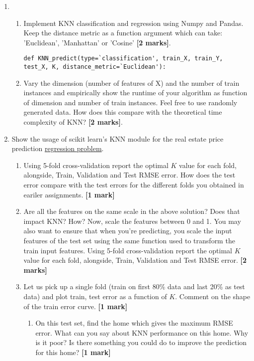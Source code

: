 \documentclass[colorlinks,linkcolor=true]{article}
\begin{document}
\begin{enumerate}


\item \begin{enumerate}
	
\item 	Implement KNN classification and regression using Numpy and Pandas. Keep the distance metric as a function argument which can take: 'Euclidean', 'Manhattan' or 'Cosine' \textbf{[2 marks]}.
\begin{verbatim}
def KNN_predict(type=`classification', train_X, train_Y, test_X, K, distance_metric=`Euclidean'):

\end{verbatim} 


	\item Vary the dimension (number of features of X) and the number of train instances and empirically show the runtime of your algorithm as function of dimension and number of train instances. Feel free to use randomly generated data. How does this compare with the theoretical time complexity of KNN?  \textbf{[2 marks]}.
\end{enumerate}

\item Show the usage of scikit learn's KNN module for the real estate price prediction \href{https://archive.ics.uci.edu/ml/datasets/Real+estate+valuation+data+set}{regression problem}.  

\begin{enumerate}
	\item Using 5-fold cross-validation report the optimal $K$ value for each fold, alongside, Train, Validation and Test RMSE error. How does the test error compare with the test errors for the different folds you obtained in eariler assignments. \textbf{[1 mark]}
	\item Are all the features on the same scale in the above solution? Does that impact KNN? How?
	Now, scale the features between 0 and 1. You may also want to ensure that when you're predicting, you scale the input features of the test set using the same function used to transform the train input features. Using 5-fold cross-validation report the optimal $K$ value for each fold, alongside, Train, Validation and Test RMSE error. \textbf{[2 marks]}
	\item Let us pick up a single fold (train on first 80\% data and last 20\% as test data) and plot train, test error as a function of $K$. Comment on the shape of the train error curve. \textbf{[1 mark]}
	\begin{enumerate}
		\item On this test set, find the home which gives the maximum RMSE error. What can you say about KNN performance on this home. Why is it poor? Is there something you could do to improve the prediction for this home? \textbf{[1 mark]}
	\end{enumerate}
\end{enumerate}


\end{enumerate}
\end{document}
